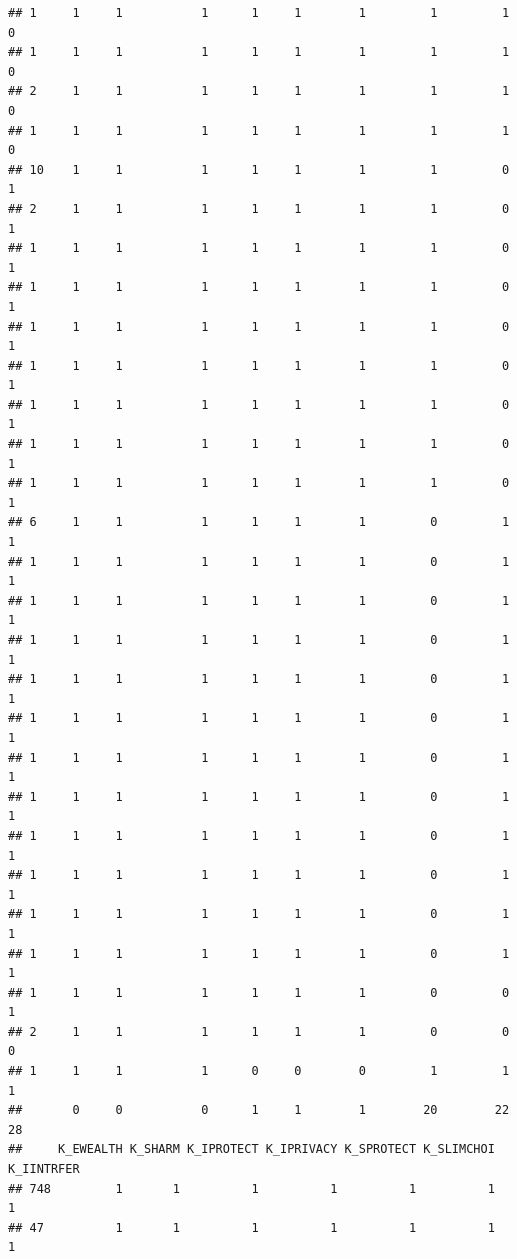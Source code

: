 \documentclass[
]{article}
\begin{document}
\begin{verbatim}
## 1     1     1           1      1     1        1         1         1          0
## 1     1     1           1      1     1        1         1         1          0
## 2     1     1           1      1     1        1         1         1          0
## 1     1     1           1      1     1        1         1         1          0
## 10    1     1           1      1     1        1         1         0          1
## 2     1     1           1      1     1        1         1         0          1
## 1     1     1           1      1     1        1         1         0          1
## 1     1     1           1      1     1        1         1         0          1
## 1     1     1           1      1     1        1         1         0          1
## 1     1     1           1      1     1        1         1         0          1
## 1     1     1           1      1     1        1         1         0          1
## 1     1     1           1      1     1        1         1         0          1
## 1     1     1           1      1     1        1         1         0          1
## 6     1     1           1      1     1        1         0         1          1
## 1     1     1           1      1     1        1         0         1          1
## 1     1     1           1      1     1        1         0         1          1
## 1     1     1           1      1     1        1         0         1          1
## 1     1     1           1      1     1        1         0         1          1
## 1     1     1           1      1     1        1         0         1          1
## 1     1     1           1      1     1        1         0         1          1
## 1     1     1           1      1     1        1         0         1          1
## 1     1     1           1      1     1        1         0         1          1
## 1     1     1           1      1     1        1         0         1          1
## 1     1     1           1      1     1        1         0         1          1
## 1     1     1           1      1     1        1         0         1          1
## 1     1     1           1      1     1        1         0         0          1
## 2     1     1           1      1     1        1         0         0          0
## 1     1     1           1      0     0        0         1         1          1
##       0     0           0      1     1        1        20        22         28
##     K_EWEALTH K_SHARM K_IPROTECT K_IPRIVACY K_SPROTECT K_SLIMCHOI K_IINTRFER
## 748         1       1          1          1          1          1          1
## 47          1       1          1          1          1          1          1

\end{verbatim}
\end{document}
